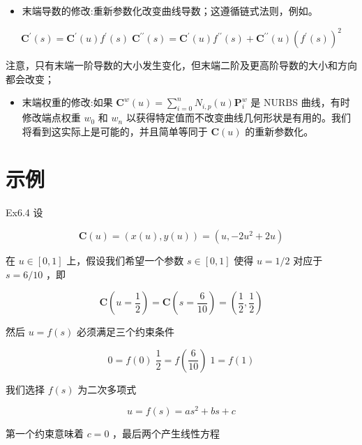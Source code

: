 \documentclass[../main.tex]{subfiles}
\begin{document}
\begin{itemize}
\item 末端导数的修改:重新参数化改变曲线导数；这遵循链式法则，例如。
\end{itemize}

\[
{\mathbf{C}}^{\prime }\left( s\right)  = {\mathbf{C}}^{\prime }\left( u\right) {f}^{\prime }\left( s\right) \;{\mathbf{C}}^{\prime \prime }\left( s\right)  = {\mathbf{C}}^{\prime }\left( u\right) {f}^{\prime \prime }\left( s\right)  + {\mathbf{C}}^{\prime \prime }\left( u\right) {\left( {f}^{\prime }\left( s\right) \right) }^{2}
\]

注意，只有末端一阶导数的大小发生变化，但末端二阶及更高阶导数的大小和方向都会改变；

\begin{itemize}
\item 末端权重的修改:如果 \({\mathbf{C}}^{w}\left( u\right)  = \mathop{\sum }\limits_{{i = 0}}^{n}{N}_{i,p}\left( u\right) {\mathbf{P}}_{i}^{w}\) 是 NURBS 曲线，有时修改端点权重 \({w}_{0}\) 和 \({w}_{n}\) 以获得特定值而不改变曲线几何形状是有用的。我们将看到这实际上是可能的，并且简单等同于 \(\mathbf{C}\left( u\right)\) 的重新参数化。
\end{itemize}

\section*{示例}

Ex6.4 设

\[
\mathbf{C}\left( u\right)  = \left( {x\left( u\right) ,y\left( u\right) }\right)  = \left( {u, - 2{u}^{2} + {2u}}\right)  \tag{6.24}
\]

在 \(u \in  \left\lbrack  {0,1}\right\rbrack\) 上，假设我们希望一个参数 \(s \in  \left\lbrack  {0,1}\right\rbrack\) 使得 \(u = 1/2\) 对应于 \(s = 6/{10}\) ，即

\[
\mathbf{C}\left( {u = \frac{1}{2}}\right)  = \mathbf{C}\left( {s = \frac{6}{10}}\right)  = \left( {\frac{1}{2},\frac{1}{2}}\right)
\]

然后 \(u = f\left( s\right)\) 必须满足三个约束条件

\[
0 = f\left( 0\right) \;\frac{1}{2} = f\left( \frac{6}{10}\right) \;1 = f\left( 1\right)
\]

我们选择 \(f\left( s\right)\) 为二次多项式

\[
u = f\left( s\right)  = a{s}^{2} + {bs} + c
\]

第一个约束意味着 \(c = 0\) ，最后两个产生线性方程
\end{document}
